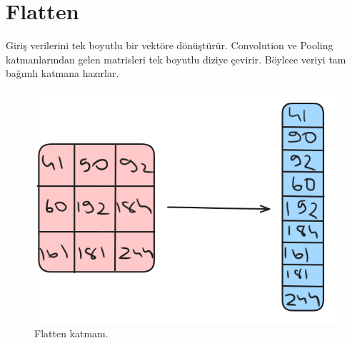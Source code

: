 \section{Flatten}
Giriş verilerini tek boyutlu bir vektöre dönüştürür. Convolution ve Pooling katmanlarından gelen matrisleri tek boyutlu diziye çevirir. Böylece veriyi tam bağımlı katmana hazırlar.

\begin{figure}[h]
    \centering
    \includegraphics[width=1\textwidth]{images/flatten_layer.png}
    \caption{Flatten katmanı.}
    \label{fig:enter-label}
\end{figure}

\newpage